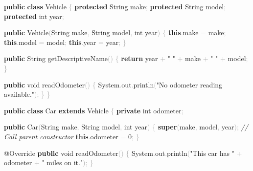 \documentclass[
  justified,
  openright,
]{tufte-book}
\newcommand{\KeywordTok}[1]{\textcolor{CodeKeyword}{\textbf{#1}}}  %
\newcommand{\StringTok}[1]{\textcolor{CodeString}{#1}}              %
\newcommand{\CommentTok}[1]{\textcolor{CodeComment}{\textit{#1}}}  %
\newcommand{\CodeNumTok}[1]{\textcolor{CodeNumber}{#1}}             %
\newcommand{\CodeFuncTok}[1]{\textcolor{CodeKeyword}{#1}}           %
\newcommand{\CodeTypeTok}[1]{\textcolor{CodeType}{#1}}              %
\newcommand{\OperatorTok}[1]{\textcolor{DarkGray}{#1}}              %
\newenvironment{Shaded}{%
  \begin{mdframed}[style=TufteCode]%
}{%
  \end{mdframed}%
}
\begin{document}
\begin{Shaded}
\begin{Highlighting}[]
\KeywordTok{public} \KeywordTok{class} Vehicle \OperatorTok{\{}
    \KeywordTok{protected} String make\OperatorTok{;}
    \KeywordTok{protected} String model\OperatorTok{;}
    \KeywordTok{protected} \CodeTypeTok{int} year\OperatorTok{;}
 
    \KeywordTok{public} \CodeFuncTok{Vehicle}\OperatorTok{(}String make\OperatorTok{,} String model\OperatorTok{,} \CodeTypeTok{int} year\OperatorTok{)} \OperatorTok{\{}
        \KeywordTok{this}\OperatorTok{.}\CodeFuncTok{make} \OperatorTok{=} make\OperatorTok{;}
        \KeywordTok{this}\OperatorTok{.}\CodeFuncTok{model} \OperatorTok{=} model\OperatorTok{;}
        \KeywordTok{this}\OperatorTok{.}\CodeFuncTok{year} \OperatorTok{=} year\OperatorTok{;}
    \OperatorTok{\}}
 
    \KeywordTok{public} String \CodeFuncTok{getDescriptiveName}\OperatorTok{()} \OperatorTok{\{}
        \KeywordTok{return} year \OperatorTok{+} \StringTok{" "} \OperatorTok{+} make \OperatorTok{+} \StringTok{" "} \OperatorTok{+} model\OperatorTok{;}
    \OperatorTok{\}}
 
    \KeywordTok{public} \CodeTypeTok{void} \CodeFuncTok{readOdometer}\OperatorTok{()} \OperatorTok{\{}
        System\OperatorTok{.}\CodeFuncTok{out}\OperatorTok{.}\CodeFuncTok{println}\OperatorTok{(}\StringTok{"No odometer reading available."}\OperatorTok{);}
    \OperatorTok{\}}
\OperatorTok{\}}
 
\KeywordTok{public} \KeywordTok{class} Car \KeywordTok{extends} Vehicle \OperatorTok{\{}
    \KeywordTok{private} \CodeTypeTok{int} odometer\OperatorTok{;}
 
    \KeywordTok{public} \CodeFuncTok{Car}\OperatorTok{(}String make\OperatorTok{,} String model\OperatorTok{,} \CodeTypeTok{int} year\OperatorTok{)} \OperatorTok{\{}
        \KeywordTok{super}\OperatorTok{(}make\OperatorTok{,} model\OperatorTok{,} year\OperatorTok{);}   \CommentTok{// Call parent constructor}
        \KeywordTok{this}\OperatorTok{.}\CodeFuncTok{odometer} \OperatorTok{=} \CodeNumTok{0}\OperatorTok{;}
    \OperatorTok{\}}
 
    \CodeTypeTok{@Override}
    \KeywordTok{public} \CodeTypeTok{void} \CodeFuncTok{readOdometer}\OperatorTok{()} \OperatorTok{\{}
        System\OperatorTok{.}\CodeFuncTok{out}\OperatorTok{.}\CodeFuncTok{println}\OperatorTok{(}\StringTok{"This car has "} \OperatorTok{+} odometer \OperatorTok{+} \StringTok{" miles on it."}\OperatorTok{);}
    \OperatorTok{\}}
 

\end{Highlighting}
\end{Shaded}
\end{document}
